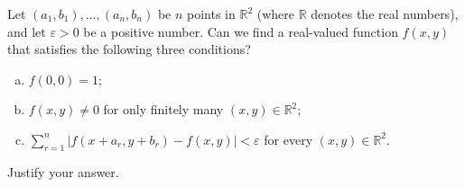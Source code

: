 Let $(a_1, b_1), \dots, (a_n, b_n)$ be $n$ points in $\mathbb{R}^2$ (where
$\mathbb{R}$ denotes the real numbers), and let $\varepsilon > 0$ be a positive
number. Can we find a real-valued function $f(x, y)$ that satisfies the
following three conditions?

\begin{enumerate}[(a)]
\item $f(0, 0) = 1$;
\item $f(x, y) \ne 0$ for only finitely many $(x, y) \in \mathbb{R}^2$;
\item $\displaystyle \sum_{r=1}^n |f(x + a_r, y + b_r) - f(x, y)| < \varepsilon$ for every $(x, y) \in \mathbb{R}^2$.
\end{enumerate}
Justify your answer.
